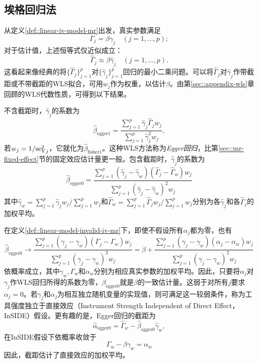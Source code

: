 \subsection{埃格回归法}


从定义\ref{def::linear-iv-model-mr}出发，真实参数满足$$
\Gamma_j = \beta \gamma_j \quad (j=1,\ldots, p);
$$对于估计值，上述恒等式仅近似成立：$$
\hat \Gamma_j \approx  \beta \hat \gamma_j \quad (j=1,\ldots, p).
$$这看起来像经典的将$\{\hat \Gamma_j \}_{j=1}^p$对$\{\hat \gamma_j \}_{j=1}^p$回归的最小二乘问题。可以将$\hat \Gamma_j$对$\hat \gamma_j$作带截距或不带截距的WLS拟合，可用$w_j$作为权重，以估计$\beta$。由第\ref{sec::appendix-wls}章回顾的WLS代数性质，可得到以下结果。 


不含截距时，$\hat \gamma_j$的系数为$$
\hat{\beta}_{\text{egger}1}  = \frac{  \sum_{j=1}^p  \hat \gamma_j  \hat \Gamma_j w_j     }{ \sum_{j=1}^p  \hat \gamma_j ^2 w_j },
$$若$w_j =  1/\textup{se}_{Yj}^2$，它就化为$\hat{\beta}_{\text{fisher}1} $。这种WLS方法称为{\it Egger回归}，比第\ref{sec::mr-fixed-effect}节的固定效应估计量更一般。包含截距时，$\hat \gamma_j$的系数为$$
\hat{\beta}_{\text{egger}0}  =  \frac{  \sum_{j=1}^p  (\hat \gamma_j  - \hat \gamma_w) (\hat \Gamma_j - \hat \Gamma_w) w_j     }
{ \sum_{j=1}^p  (\hat \gamma_j  - \hat \gamma_w) ^2 w_j }
$$其中$\hat \gamma_w = \sum_{j=1}^p \hat \gamma_j w_j /  \sum_{j=1}^p   w_j  $和$\hat \Gamma_w = \sum_{j=1}^p \hat \Gamma_j w_j /  \sum_{j=1}^p   w_j  $分别为各$\hat \gamma_j$和各$\hat \Gamma_j$的加权平均。 





在定义\ref{def::linear-model-invalid-iv-mr}下，即使不假设所有$\alpha_j$都为零，也有$$
\hat{\beta}_{\text{egger}0} \rightarrow 
\frac{  \sum_{j=1}^p  (  \gamma_j  -   \gamma_w) ( \Gamma_j -   \Gamma_w) w_j     }
{ \sum_{j=1}^p  (  \gamma_j  -  \gamma_w) ^2 w_j }
=\beta + \frac{  \sum_{j=1}^p  (  \gamma_j  -   \gamma_w) ( \alpha_j -   \alpha_w) w_j     }
{ \sum_{j=1}^p  (  \gamma_j  -  \gamma_w) ^2 w_j }
$$依概率成立，其中$\gamma_w, \Gamma_w$和$\alpha_w$分别为相应真实参数的加权平均。因此，只要将$\alpha_j$对$\gamma_j$作WLS回归所得的系数为零，$\hat{\beta}_{\text{egger}0} $就是$\beta$的一致估计量。这弱于对所有$j$要求$\alpha_j=0$。若$\gamma_j$和$\alpha_j$为相互独立随机变量的实现值，则可满足这一较弱条件，称为工具强度独立于直接效应（Instrument Strength Independent of Direct Effect，InSIDE）假设\citep{bowden2015mendelian}。更有趣的是，Egger回归的截距为$$
\hat{\alpha}_{\text{egger}0}  = \hat \Gamma_w - \hat{\beta}_{\text{egger}0}  \hat \gamma_w,
$$在InSIDE假设下依概率收敛于$$
\Gamma_w -  \beta  \gamma_w = \alpha_w
$$因此，截距估计了直接效应的加权平均。 


